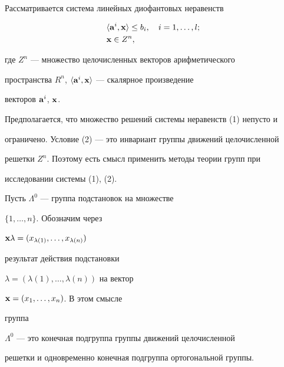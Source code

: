 \maketitle










Рассматривается система линейных диофантовых неравенств


\begin{align}


&\la\bold a^i,\bold x\ra\le b_i,\quad i=1,\dotsc,l;\\


&\bold x\in Z^n,


\end{align}


где $Z^n$ --- множество целочисленных векторов арифметического


пространства $R^n$, $\langle\bold a^i,\bold x\rangle$ --- скалярное произведение


векторов $\bold a^i$, $\bold x$.





Предполагается, что множество решений системы неравенств (1) непусто и


ограничено. Условие (2) --- это инвариант группы движений целочисленной


решетки $Z^n$. Поэтому есть смысл применить методы теории групп при


исследовании системы (1), (2).





Пусть $\Lambda^0$ --- группа подстановок на множестве


$\{1,\dotsc,n\}$. Обозначим через


$\bold x\lambda=(x_{\lambda(1)},\dotsc,\linebreak


x_{\lambda(n)})$


результат действия подстановки


$\lambda=(\lambda(1),\dotsc,\lambda(n))$ на вектор


$\bold x=(x_1,\dotsc,x_n)$. В этом смысле


группа


$\Lambda^0$ --- это конечная подгруппа группы движений целочисленной


решетки и одновременно конечная подгруппа ортогональной группы.






